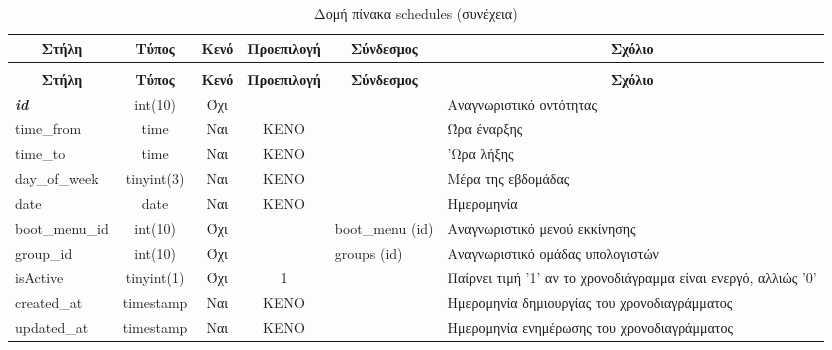 %
%
\begin{longtable}{|l|c|c|c|l|p{4.5cm}|}
	\caption{Δομή πίνακα schedules} \label{tab:schedules-structure} \\
	\hline \multicolumn{1}{|c|}{\textbf{Στήλη}} & \multicolumn{1}{|c|}{\textbf{Τύπος}} & \multicolumn{1}{|c|}{\textbf{Κενό}} & \multicolumn{1}{|c|}{\textbf{Προεπιλογή}} & \multicolumn{1}{|c|}{\textbf{Σύνδεσμος}} & \multicolumn{1}{|c|}{\textbf{Σχόλιο}} \\ \hline \hline \endfirsthead
	\caption[{}]{Δομή πίνακα schedules (συνέχεια)} \\
	\hline \multicolumn{1}{|c|}{\textbf{Στήλη}} & \multicolumn{1}{|c|}{\textbf{Τύπος}} & \multicolumn{1}{|c|}{\textbf{Κενό}} & \multicolumn{1}{|c|}{\textbf{Προεπιλογή}} & \multicolumn{1}{|c|}{\textbf{Σύνδεσμος}} & \multicolumn{1}{|c|}{\textbf{Σχόλιο}} \\ \hline \hline \endhead \endfoot
	\textbf{\textit{id}} & int(10) & Όχι &  &  & Αναγνωριστικό οντότητας \\ \hline
	time\_from & time & Ναι & ΚΕΝΟ &  & Ώρα έναρξης \\ \hline
	time\_to & time & Ναι & ΚΕΝΟ &  & 'Ωρα λήξης \\ \hline
	day\_of\_week & tinyint(3) & Ναι & ΚΕΝΟ &  & Μέρα της εβδομάδας \\ \hline
	date & date & Ναι & ΚΕΝΟ &  & Ημερομηνία \\ \hline
	boot\_menu\_id & int(10) & Όχι &  & boot\_menu (id) & Αναγνωριστικό μενού εκκίνησης \\ \hline
	group\_id & int(10) & Όχι &  & groups (id) & Αναγνωριστικό ομάδας υπολογιστών \\ \hline
	isActive & tinyint(1) & Όχι & 1 &  & Παίρνει τιμή '1' αν το χρονοδιάγραμμα είναι ενεργό, αλλιώς '0'  \\ \hline
	created\_at & timestamp & Ναι & ΚΕΝΟ &  & Ημερομηνία δημιουργίας του χρονοδιαγράμματος \\ \hline
	updated\_at & timestamp & Ναι & ΚΕΝΟ &  & Ημερομηνία ενημέρωσης του χρονοδιαγράμματος \\ \hline
\end{longtable}

